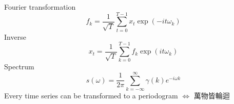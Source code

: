 \documentclass[compress]{beamer}
\begin{document}
\begin{frame}
Fourier transformation
\begin{equation*}
	f_k = \frac{1}{\sqrt{T}}\sum\limits_{t = 0}^{T - 1} x_t \exp(-i t {\omega}_{k})
\end{equation*}
Inverse
\begin{equation*}
	x_t = \frac{1}{\sqrt{T}}\sum\limits_{k = 0}^{T - 1} f_k \exp(i t {\omega}_{k})
\end{equation*}
Spectrum
\begin{equation*}
	s(\omega) = \frac{1}{2 \pi}\sum\limits_{k = -\infty}^{\infty} \gamma(k) e^{-i \omega k}
\end{equation*}
Every time series can be transformed to a periodogram $\Leftrightarrow$ 萬物皆輪迴
\end{frame}


\end{document}
